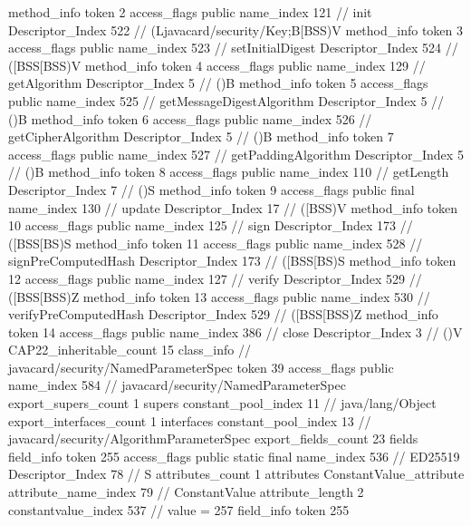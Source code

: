 {{{{{				}
				method_info {
					token	2
					access_flags	public
					name_index	121		// init
					Descriptor_Index	522		// (Ljavacard/security/Key;B[BSS)V
				}
				method_info {
					token	3
					access_flags	public
					name_index	523		// setInitialDigest
					Descriptor_Index	524		// ([BSS[BSS)V
				}
				method_info {
					token	4
					access_flags	public
					name_index	129		// getAlgorithm
					Descriptor_Index	5		// ()B
				}
				method_info {
					token	5
					access_flags	public
					name_index	525		// getMessageDigestAlgorithm
					Descriptor_Index	5		// ()B
				}
				method_info {
					token	6
					access_flags	public
					name_index	526		// getCipherAlgorithm
					Descriptor_Index	5		// ()B
				}
				method_info {
					token	7
					access_flags	public
					name_index	527		// getPaddingAlgorithm
					Descriptor_Index	5		// ()B
				}
				method_info {
					token	8
					access_flags	public
					name_index	110		// getLength
					Descriptor_Index	7		// ()S
				}
				method_info {
					token	9
					access_flags	public final
					name_index	130		// update
					Descriptor_Index	17		// ([BSS)V
				}
				method_info {
					token	10
					access_flags	public
					name_index	125		// sign
					Descriptor_Index	173		// ([BSS[BS)S
				}
				method_info {
					token	11
					access_flags	public
					name_index	528		// signPreComputedHash
					Descriptor_Index	173		// ([BSS[BS)S
				}
				method_info {
					token	12
					access_flags	public
					name_index	127		// verify
					Descriptor_Index	529		// ([BSS[BSS)Z
				}
				method_info {
					token	13
					access_flags	public
					name_index	530		// verifyPreComputedHash
					Descriptor_Index	529		// ([BSS[BSS)Z
				}
				method_info {
					token	14
					access_flags	public
					name_index	386		// close
					Descriptor_Index	3		// ()V
				}
			}
			CAP22_inheritable_count	15
		}
		class_info {		// javacard/security/NamedParameterSpec
			token	39
			access_flags	public
			name_index	584		// javacard/security/NamedParameterSpec
			export_supers_count	1
			supers {
				constant_pool_index	11		// java/lang/Object
			}
			export_interfaces_count	1
			interfaces {
				constant_pool_index	13		// javacard/security/AlgorithmParameterSpec
			}
			export_fields_count	23
			fields {
			field_info {
				token	255
				access_flags	public static final
				name_index	536		// ED25519
				Descriptor_Index	78		// S
				attributes_count	1
				attributes {
				ConstantValue_attribute {
					attribute_name_index	79		// ConstantValue
					attribute_length	2
					constantvalue_index	537		// value = 257
				}
				}
			}
			field_info {
				token	255
}}}}}

